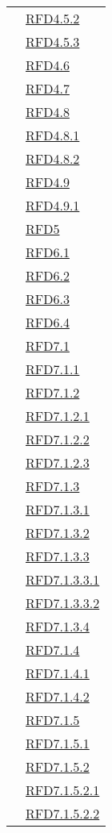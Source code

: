 \begin{longtable}{|>{\centering}m{5cm}|m{5cm}<{\centering}|}
& \hyperlink{RFD4.5.2}{RFD4.5.2}\\
& \hyperlink{RFD4.5.3}{RFD4.5.3}\\
& \hyperlink{RFD4.6}{RFD4.6}\\
& \hyperlink{RFD4.7}{RFD4.7}\\
& \hyperlink{RFD4.8}{RFD4.8}\\
& \hyperlink{RFD4.8.1}{RFD4.8.1}\\
& \hyperlink{RFD4.8.2}{RFD4.8.2}\\
& \hyperlink{RFD4.9}{RFD4.9}\\
& \hyperlink{RFD4.9.1}{RFD4.9.1}\\
& \hyperlink{RFD5}{RFD5}\\
& \hyperlink{RFD6.1}{RFD6.1}\\
& \hyperlink{RFD6.2}{RFD6.2}\\
& \hyperlink{RFD6.3}{RFD6.3}\\
& \hyperlink{RFD6.4}{RFD6.4}\\
& \hyperlink{RFD7.1}{RFD7.1}\\
& \hyperlink{RFD7.1.1}{RFD7.1.1}\\
& \hyperlink{RFD7.1.2}{RFD7.1.2}\\
& \hyperlink{RFD7.1.2.1}{RFD7.1.2.1}\\
& \hyperlink{RFD7.1.2.2}{RFD7.1.2.2}\\
& \hyperlink{RFD7.1.2.3}{RFD7.1.2.3}\\
& \hyperlink{RFD7.1.3}{RFD7.1.3}\\
& \hyperlink{RFD7.1.3.1}{RFD7.1.3.1}\\
& \hyperlink{RFD7.1.3.2}{RFD7.1.3.2}\\
& \hyperlink{RFD7.1.3.3}{RFD7.1.3.3}\\
& \hyperlink{RFD7.1.3.3.1}{RFD7.1.3.3.1}\\
& \hyperlink{RFD7.1.3.3.2}{RFD7.1.3.3.2}\\
& \hyperlink{RFD7.1.3.4}{RFD7.1.3.4}\\
& \hyperlink{RFD7.1.4}{RFD7.1.4}\\
& \hyperlink{RFD7.1.4.1}{RFD7.1.4.1}\\
& \hyperlink{RFD7.1.4.2}{RFD7.1.4.2}\\
& \hyperlink{RFD7.1.5}{RFD7.1.5}\\
& \hyperlink{RFD7.1.5.1}{RFD7.1.5.1}\\
& \hyperlink{RFD7.1.5.2}{RFD7.1.5.2}\\
& \hyperlink{RFD7.1.5.2.1}{RFD7.1.5.2.1}\\
& \hyperlink{RFD7.1.5.2.2}{RFD7.1.5.2.2}\\

\end{longtable}
